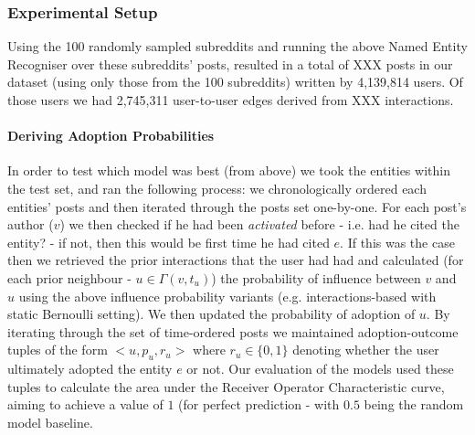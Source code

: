 \documentclass[journal,10pt,draftclsnofoot,onecolumn]{IEEEtran}
\begin{document}
\subsubsection{Experimental Setup}
Using the 100 randomly sampled subreddits and running the above Named Entity Recogniser over these subreddits' posts, resulted in a total of XXX posts in our dataset (using only those from the 100 subreddits) written by 4,139,814 users.
Of those users we had 2,745,311 user-to-user edges derived from XXX interactions.

\paragraph{Deriving Adoption Probabilities}
In order to test which model was best (from above) we took the entities within the test set, and ran the following process: we chronologically ordered each entities' posts and then iterated through the posts set one-by-one.
For each post's author ($v$) we then checked if he had been \emph{activated} before - i.e. had he cited the entity? - if not, then this would be first time he had cited $e$.
If this was the case then we retrieved the prior interactions that the user had had and calculated (for each prior neighbour - $u \in \Gamma(v, t_u)$) the probability of influence between $v$ and $u$ using the above influence probability variants (e.g. interactions-based with static Bernoulli setting).
We then updated the probability of adoption of $u$.
By iterating through the set of time-ordered posts we maintained adoption-outcome tuples of the form $<u, p_u, r_u>$ where $r_u \in \{0,1\}$ denoting whether the user ultimately adopted the entity $e$ or not.
Our evaluation of the models used these tuples to calculate the area under the Receiver Operator Characteristic curve, aiming to achieve a value of $1$ (for perfect prediction - with $0.5$ being the random model baseline.
\end{document}
